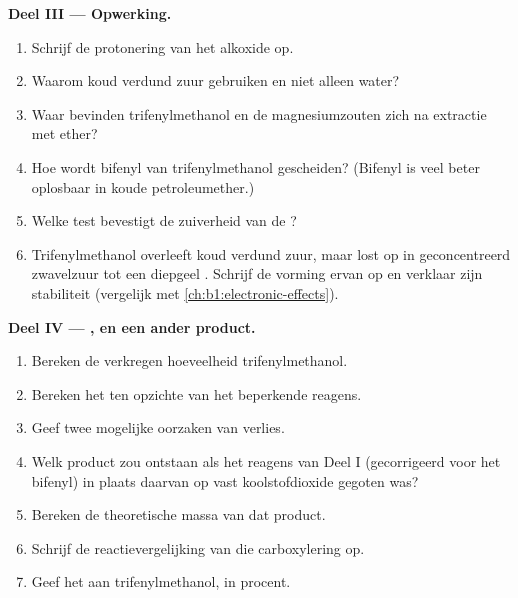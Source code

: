 \begin{problem}
\medskip
\noindent\textbf{Deel III --- Opwerking.}
\begin{enumerate}[resume]
  \item Schrijf de protonering van het alkoxide op.
  \item Waarom koud verdund zuur gebruiken en niet alleen water?
  \item Waar bevinden trifenylmethanol en de magnesiumzouten zich na
        extractie met ether?
  \item Hoe wordt bifenyl van trifenylmethanol gescheiden? (Bifenyl is
        veel beter oplosbaar in koude petroleumether.)
  \item Welke test bevestigt de zuiverheid van de ?
  \item Trifenylmethanol overleeft koud verdund zuur, maar lost op in
        geconcentreerd zwavelzuur tot een diepgeel . Schrijf de
        vorming ervan op en verklaar zijn stabiliteit (vergelijk met
        \cref{ch:b1:electronic-effects}).
\end{enumerate}

\medskip
\noindent\textbf{Deel IV --- , en een ander product.}
\begin{enumerate}[resume]
  \item Bereken de verkregen hoeveelheid trifenylmethanol.
  \item Bereken het  ten opzichte van het beperkende reagens.
  \item Geef twee mogelijke oorzaken van verlies.
  \item Welk product zou ontstaan als het reagens van Deel I (gecorrigeerd
        voor het bifenyl) in plaats daarvan op vast koolstofdioxide
        gegoten was?
  \item Bereken de theoretische massa van dat product.
  \item Schrijf de reactievergelijking van die carboxylering op.
  \item Geef het  aan trifenylmethanol, in procent.
\end{enumerate}
\end{problem}
